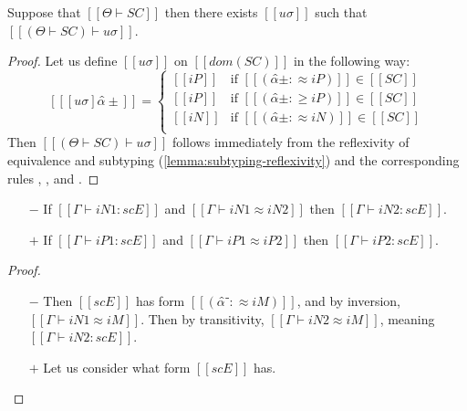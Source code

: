 \begin{lemma}
    \label{lemma:constraint-sat}
    Suppose that $[[Θ ⊢ SC]]$ then there exists 
    $[[uσ]]$ such that $[[(Θ  ⊢  SC) ⊢ uσ]]$.
\end{lemma}
\begin{proof}
    Let us define $[[uσ]]$
    on $[[dom(SC)]]$ in the following way: 
    $$
    [[ [uσ]α̂± ]] = 
    \begin{cases}
        [[iP]] & \text{if $[[(α̂± :≈ iP)]] \in [[SC]]$} \\
        [[iP]] & \text{if $[[(α̂± :≥ iP)]] \in [[SC]]$} \\
        [[iN]] & \text{if $[[(α̂± :≈ iN)]] \in [[SC]]$} \\
    \end{cases}
    $$
    Then $[[(Θ  ⊢  SC) ⊢ uσ]]$ follows immediately
    from the reflexivity of equivalence and subtyping
    (\cref{lemma:subtyping-reflexivity}) and the corresponding
    rules 
    , 
    ,
    and .
\end{proof}


\begin{lemma}
    \label{lemma:entry-sat-equiv}
    \begin{itemize}
        \item [$-$] If $[[Γ ⊢ iN1 : scE]]$ and $[[Γ ⊢ iN1 ≈ iN2]]$ then $[[Γ ⊢ iN2 : scE]]$.
        \item [$+$] If $[[Γ ⊢ iP1 : scE]]$ and $[[Γ ⊢ iP1 ≈ iP2]]$ then $[[Γ ⊢ iP2 : scE]]$.
    \end{itemize}
\end{lemma}
\begin{proof}
    \begin{itemize}
        \item [$-$] Then $[[scE]]$ has form $[[(α̂⁻ :≈ iM)]]$, 
            and by inversion, $[[Γ ⊢ iN1 ≈ iM]]$.
            Then by transitivity, $[[Γ ⊢ iN2 ≈ iM]]$, 
            meaning $[[Γ ⊢ iN2 : scE]]$.
        \item [$+$] Let us consider what form $[[scE]]$ has.
    \end{itemize}
\end{proof}

